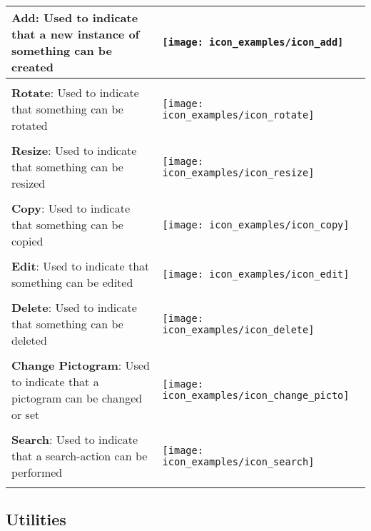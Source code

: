 \begin{longtable}{m{\textwidth-2.2cm} m{1.5cm}}
	\textbf{Add}: Used to indicate that a new instance of something can be created & \parbox[c]{1.2cm}{
	\texttt{[image: icon\_examples/icon\_add]}} \\[0.6cm] \hline \\[-1em]

	\textbf{Rotate}: Used to indicate that something can be rotated & \parbox[c]{1.2cm}{
	\texttt{[image: icon\_examples/icon\_rotate]}} \\[0.6cm] \hline \\[-1em]

	\textbf{Resize}: Used to indicate that something can be resized & \parbox[c]{1.2cm}{
	\texttt{[image: icon\_examples/icon\_resize]}} \\[0.6cm] \hline \\[-1em]

	\textbf{Copy}: Used to indicate that something can be copied & \parbox[c]{1.2cm}{
	\texttt{[image: icon\_examples/icon\_copy]}} \\[0.6cm] \hline \\[-1em]

	\textbf{Edit}: Used to indicate that something can be edited & \parbox[c]{1.2cm}{
	\texttt{[image: icon\_examples/icon\_edit]}} \\[0.6cm] \hline \\[-1em]

	\textbf{Delete}: Used to indicate that something can be deleted & \parbox[c]{1.2cm}{
	\texttt{[image: icon\_examples/icon\_delete]}} \\[0.6cm] \hline \\[-1em]

	\textbf{Change Pictogram}: Used to indicate that a pictogram can be changed or set & \parbox[c]{1.2cm}{
	\texttt{[image: icon\_examples/icon\_change\_picto]}} \\[0.6cm] \hline \\[-1em]

	\textbf{Search}: Used to indicate that a search-action can be performed & \parbox[c]{1.2cm}{
	\texttt{[image: icon\_examples/icon\_search]}} \\[0.6cm] \hline \\[-1em]
\end{longtable}


\subsection{Utilities}

